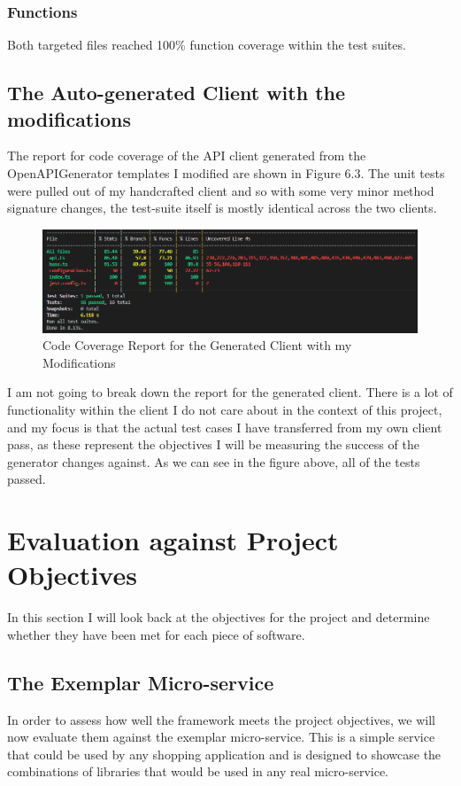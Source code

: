 \subsubsection{Functions}
Both targeted files reached 100\% function coverage within the test suites.
\subsection{The Auto-generated Client with the modifications}
The report for code coverage of the API client generated from the OpenAPIGenerator templates I modified are shown in Figure 6.3. The unit tests were pulled out of my handcrafted client and so with some very minor method signature changes, the test-suite itself is mostly identical across the two clients.
\begin{figure}[!htb]
\caption{Code Coverage Report for the Generated Client with my Modifications}
\centering
\includegraphics[scale=0.55]{FYP_Dissertation_template/Figures/modified-client-code-coverage.PNG}
\end{figure}
\FloatBarrier
I am not going to break down the report for the generated client. There is a lot of functionality within the client I do not care about in the context of this project, and my focus is that the actual test cases I have transferred from my own client pass, as these represent the objectives I will be measuring the success of the generator changes against. As we can see in the figure above, all of the tests passed.
\section{Evaluation against Project Objectives}
In this section I will look back at the objectives for the project and determine whether they have been met for each piece of software.
\subsection{The Exemplar Micro-service}
In order to assess how well the framework meets the project objectives, we will now evaluate them against the exemplar micro-service. This is a simple service that could be used by any shopping application and is designed to showcase the combinations of libraries that would be used in any real micro-service.
